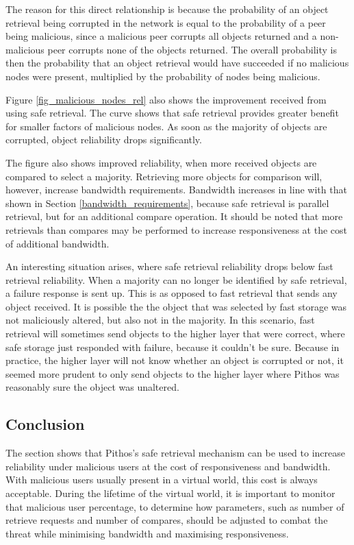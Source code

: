 The reason for this direct relationship is because the probability of an object retrieval being corrupted in the network is equal to the probability of a peer being malicious, since a malicious peer corrupts all objects returned and a non-malicious peer corrupts none of the objects returned. The overall probability is then the probability that an object retrieval would have succeeded if no malicious nodes were present, multiplied by the probability of nodes being malicious.

Figure \ref{fig_malicious_nodes_rel} also shows the improvement received from using safe retrieval. The curve shows that safe retrieval provides greater benefit for smaller factors of malicious nodes. As soon as the majority of objects are corrupted, object reliability drops significantly.

The figure also shows improved reliability, when more received objects are compared to select a majority. Retrieving more objects for comparison will, however, increase bandwidth requirements. Bandwidth increases in line with that shown in Section \ref{bandwidth_requirements}, because safe retrieval is parallel retrieval, but for an additional compare operation. It should be noted that more retrievals than compares may be performed to increase responsiveness at the cost of additional bandwidth.

An interesting situation arises, where safe retrieval reliability drops below fast retrieval reliability. When a majority can no longer be identified by safe retrieval, a failure response is sent up. This is as opposed to fast retrieval that sends any object received. It is possible the the object that was selected by fast storage was not maliciously altered, but also not in the majority. In this scenario, fast retrieval will sometimes send objects to the higher layer that were correct, where safe storage just responded with failure, because it couldn't be sure. Because in practice, the higher layer will not know whether an object is corrupted or not, it seemed more prudent to only send objects to the higher layer where Pithos was reasonably sure the object was unaltered.

\subsection{Conclusion}

The section shows that Pithos's safe retrieval mechanism can be used to increase reliability under malicious users at the cost of responsiveness and bandwidth. With malicious users usually present in a virtual world, this cost is always acceptable. During the lifetime of the virtual world, it is important to monitor that malicious user percentage, to determine how parameters, such as number of retrieve requests and number of compares, should be adjusted to combat the threat while minimising bandwidth and maximising responsiveness.

